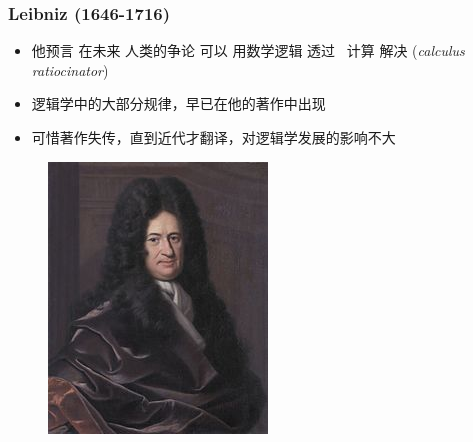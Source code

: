 \documentclass[17pt]{beamer}
\begin{document}
\begin{frame}
\frametitle{Leibniz (1646-1716)}
\fontsize{15}{15}\selectfont
\begin{minipage}[t]{0.6\linewidth}
	\begin{itemize}
		\item 他预言 在未来 人类的争论 可以 用数学逻辑 透过 {\color{red}\ 计算} 解决 (\textit{calculus ratiocinator})
		\item 逻辑学中的大部分规律，早已在他的著作中出现
		\item 可惜著作失传，直到近代才翻译，对逻辑学发展的影响不大
	\end{itemize}
\end{minipage}
\hfill
\begin{minipage}[t]{0.35\linewidth}
	\begin{figure}[H]
		\includegraphics[scale=1.25]{Leibniz.jpg}
	\end{figure}
\end{minipage}
\end{frame}
\end{document}
